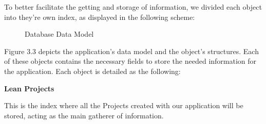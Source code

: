 \documentclass[a4paper,twoside,10pt]{report}
\begin{document}
To better facilitate the getting and storage of information, we divided each object into they're own index, as displayed in the following scheme:

\begin{figure}[h!]
    \center
    \caption{Database Data Model}
\end{figure}

Figure 3.3 depicts the application's data model and the object's structures. Each of these objects contains the necessary fields to store the needed information for the application. 
\newpage
Each object is detailed as the following:
\newline

\textbf{Lean Projects}

This is the index where all the Projects created with our application will be stored, acting as the main gatherer of information.
\end{document}
